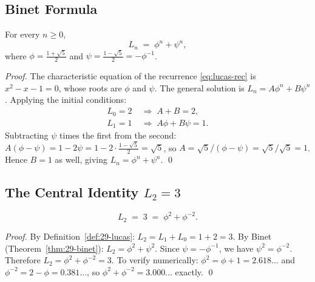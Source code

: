 \subsection{Binet Formula}

\begin{theorem}
\label{thm:29-binet}
For every $n \ge 0$,
\begin{equation}
  L_n \;=\; \phi^n + \psi^n,
  \label{eq:binet-lucas}
\end{equation}
where $\phi = \frac{1 + \sqrt{5}}{2}$ and $\psi = \frac{1 - \sqrt{5}}{2}
= -\phi^{-1}$.
\end{theorem}
\begin{proof}
The characteristic equation of the recurrence \eqref{eq:lucas-rec}
is $x^2 - x - 1 = 0$, whose roots are $\phi$ and $\psi$.  The general
solution is $L_n = A \phi^n + B \psi^n$.  Applying the initial
conditions:
\begin{align}
  L_0 = 2 &\;\Rightarrow\; A + B = 2, \\
  L_1 = 1 &\;\Rightarrow\; A\phi + B\psi = 1.
\end{align}
Subtracting $\psi$ times the first from the second:
$A(\phi - \psi) = 1 - 2\psi = 1 - 2 \cdot \frac{1-\sqrt{5}}{2}
= \sqrt{5}$, so $A = \sqrt{5}/(\phi - \psi) = \sqrt{5}/\sqrt{5} = 1$.
Hence $B = 1$ as well, giving $L_n = \phi^n + \psi^n$.
\qed
\end{proof}

\subsection{The Central Identity \texorpdfstring{$L_2 = 3$}{L2=3}}

\begin{theorem}[$L_2 = 3$ — Trinity Anchor]
\label{thm:29-l2-eq-3}
\begin{equation}
  L_2 \;=\; 3 \;=\; \phi^2 + \phi^{-2}.
  \label{eq:l2-eq-3}
\end{equation}
\end{theorem}
\begin{proof}
By Definition~\ref{def:29-lucas}: $L_2 = L_1 + L_0 = 1 + 2 = 3$.
By Binet (Theorem~\ref{thm:29-binet}): $L_2 = \phi^2 + \psi^2$.
Since $\psi = -\phi^{-1}$, we have $\psi^2 = \phi^{-2}$.
Therefore $L_2 = \phi^2 + \phi^{-2} = 3$.
To verify numerically:
$\phi^2 = \phi + 1 = 2.618\ldots$ and $\phi^{-2} = 2 - \phi = 0.381\ldots$,
so $\phi^2 + \phi^{-2} = 3.000\ldots$ exactly.
\qed
\end{proof}

